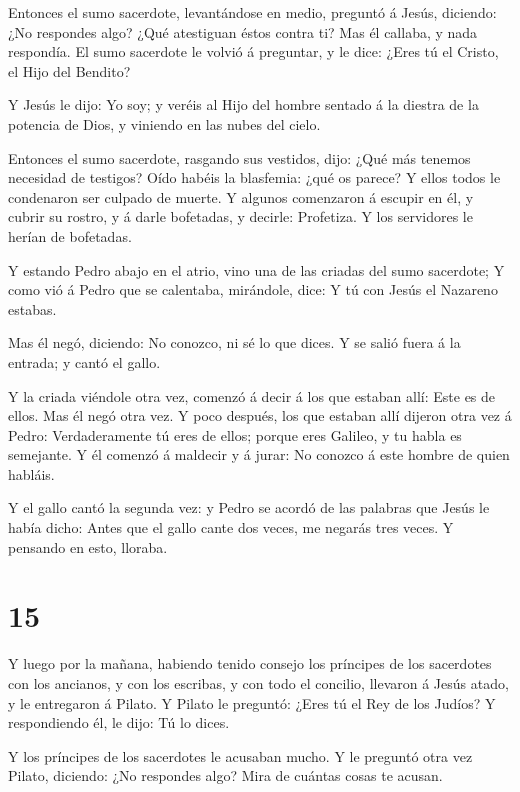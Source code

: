  Entonces el sumo sacerdote, levantándose en medio,
preguntó á Jesús, diciendo: ¿No respondes algo? ¿Qué atestiguan éstos
contra ti?  Mas él callaba, y nada respondía. El sumo
sacerdote le volvió á preguntar, y le dice: ¿Eres tú el Cristo, el Hijo
del Bendito?

 Y Jesús le dijo: Yo soy; y veréis al Hijo del hombre
sentado á la diestra de la potencia de Dios, y viniendo en las nubes del
cielo.

 Entonces el sumo sacerdote, rasgando sus vestidos, dijo:
¿Qué más tenemos necesidad de testigos?  Oído habéis la
blasfemia: ¿qué os parece? Y ellos todos le condenaron ser culpado de
muerte.  Y algunos comenzaron á escupir en él, y cubrir su
rostro, y á darle bofetadas, y decirle: Profetiza. Y los servidores le
herían de bofetadas.

 Y estando Pedro abajo en el atrio, vino una de las criadas
del sumo sacerdote;  Y como vió á Pedro que se calentaba,
mirándole, dice: Y tú con Jesús el Nazareno estabas.

 Mas él negó, diciendo: No conozco, ni sé lo que dices. Y
se salió fuera á la entrada; y cantó el gallo.

 Y la criada viéndole otra vez, comenzó á decir á los que
estaban allí: Este es de ellos.  Mas él negó otra vez. Y
poco después, los que estaban allí dijeron otra vez á Pedro:
Verdaderamente tú eres de ellos; porque eres Galileo, y tu habla es
semejante.  Y él comenzó á maldecir y á jurar: No conozco á
este hombre de quien habláis.

 Y el gallo cantó la segunda vez: y Pedro se acordó de las
palabras que Jesús le había dicho: Antes que el gallo cante dos veces,
me negarás tres veces. Y pensando en esto, lloraba.

\hypertarget{section-14}{%
\section{15}\label{section-14}}

 Y luego por la mañana, habiendo tenido consejo los
príncipes de los sacerdotes con los ancianos, y con los escribas, y con
todo el concilio, llevaron á Jesús atado, y le entregaron á Pilato.
 Y Pilato le preguntó: ¿Eres tú el Rey de los Judíos? Y
respondiendo él, le dijo: Tú lo dices.

 Y los príncipes de los sacerdotes le acusaban mucho.
 Y le preguntó otra vez Pilato, diciendo: ¿No respondes
algo? Mira de cuántas cosas te acusan.

